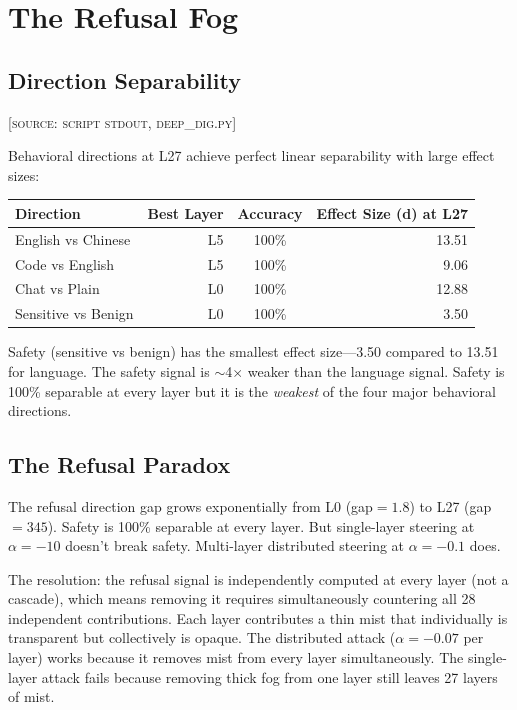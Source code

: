 \documentclass[11pt,a4paper]{article}
\begin{document}
\section{The Refusal Fog}

\subsection{Direction Separability}
\textsc{[source: script stdout, deep\_dig.py]}

Behavioral directions at L27 achieve perfect linear separability with large effect sizes:

\begin{center}
\begin{tabular}{lrcr}
\toprule
\textbf{Direction} & \textbf{Best Layer} & \textbf{Accuracy} & \textbf{Effect Size (d) at L27} \\
\midrule
English vs Chinese & L5 & 100\% & 13.51 \\
Code vs English & L5 & 100\% & 9.06 \\
Chat vs Plain & L0 & 100\% & 12.88 \\
Sensitive vs Benign & L0 & 100\% & 3.50 \\
\bottomrule
\end{tabular}
\end{center}

Safety (sensitive vs benign) has the smallest effect size---3.50 compared to 13.51 for language. The safety signal is $\sim$4$\times$ weaker than the language signal. Safety is 100\% separable at every layer but it is the \textit{weakest} of the four major behavioral directions.

\subsection{The Refusal Paradox}
The refusal direction gap grows exponentially from L0 (gap$=1.8$) to L27 (gap$=345$). Safety is 100\% separable at every layer. But single-layer steering at $\alpha=-10$ doesn't break safety. Multi-layer distributed steering at $\alpha=-0.1$ does.

The resolution: the refusal signal is independently computed at every layer (not a cascade), which means removing it requires simultaneously countering all 28 independent contributions. Each layer contributes a thin mist that individually is transparent but collectively is opaque. The distributed attack ($\alpha=-0.07$ per layer) works because it removes mist from every layer simultaneously. The single-layer attack fails because removing thick fog from one layer still leaves 27 layers of mist.
\end{document}
